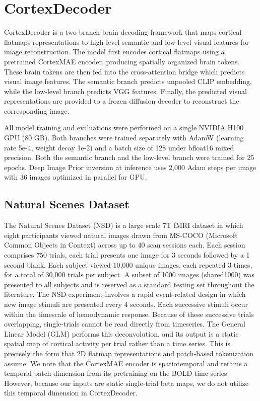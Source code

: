 \section{CortexDecoder}
\label{sec:cortex_decoder}
CortexDecoder is a two-branch brain decoding framework that maps cortical flatmaps representations to high-level semantic and low-level visual features for image reconstruction. The model first encodes cortical flatmaps using a pretrained CortexMAE encoder, producing spatially organized brain tokens. These brain tokens are then fed into the cross-attention bridge which predicts visual image features. The semantic branch predicts unpooled CLIP embedding, while the low-level branch predicts VGG features. Finally, the predicted visual representations are provided to a frozen diffusion decoder to reconstruct the corresponding image.

All model training and evaluations were performed on a single NVIDIA H100 GPU (80 GB). Both branches were trained separately with AdamW \cite{loshchilov2019decoupledweightdecayregularization} (learning rate 5e-4, weight decay 1e-2) and a batch size of 128 under bfloat16 mixed precision. Both the semantic branch and the low-level branch were trained for 25 epochs. Deep Image Prior inversion at inference uses 2,000 Adam steps per image with 36 images optimized in parallel for GPU.

\subsection{Natural Scenes Dataset}

The Natural Scenes Dataset (NSD) is a large scale 7T fMRI dataset in which eight participants viewed natural images drawn from MS-COCO (Microsoft Common Objects in Context) \cite{lin2015microsoftcococommonobjects} across up to 40 scan sessions each. Each session comprises 750 trials, each trial presents one image for 3 seconds followed by a 1 second blank. Each subject viewed 10,000 unique images, each repeated 3 times, for a total of 30,000 trials per subject. A subset of 1000 images (shared1000) was presented to all subjects and is reserved as a standard testing set throughout the literature.
The NSD experiment involves a rapid event-related design in which new image stimuli are presented every 4 seconds. Each successive stimuli occur within the timescale of hemodynamic response. Because of these successive trials overlapping, single-trials cannot be read directly from timeseries. The General Linear Model (GLM) \cite{10.7554/eLife.77599} performs this deconvolution, and its output is a static spatial map of cortical activity per trial rather than a time series. This is precisely the form that 2D flatmap representations and patch-based tokenization assume. We note that the CortexMAE encoder is spatiotemporal and retains a temporal patch dimension from its pretraining on the BOLD time series. However, because our inputs are static single-trial beta maps, we do not utilize this temporal dimension in CortexDecoder.


